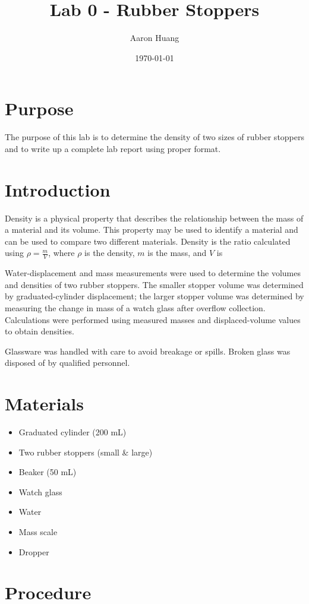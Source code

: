 \documentclass{article}
\begin{document}
\title{Lab 0 - Rubber Stoppers}
\author{Aaron Huang}
\date{\today}
\maketitle
\section{Purpose}
The purpose of this lab is to determine the density of two sizes of rubber stoppers and to write up a complete lab report using proper format.
\section{Introduction}

Density is a physical property that describes the relationship between the mass of a material and its volume. This property may be used to identify a material and can be used to compare two different materials. Density is the ratio calculated using  $\rho = \frac{m}{V}$, where $\rho$ is the density, $m$ is the mass, and $V$ is

Water-displacement and mass measurements were used to determine the volumes and densities of two rubber stoppers. The smaller stopper volume was determined by graduated-cylinder displacement; the larger stopper volume was determined by measuring the change in mass of a watch glass after overflow collection. Calculations were performed using measured masses and displaced-volume values to obtain densities.

Glassware was handled with care to avoid breakage or spills. Broken glass was disposed of by qualified personnel.


\section{Materials}
\begin{itemize}
    \item Graduated cylinder (200 mL)
    \item Two rubber stoppers (small \& large)
    \item Beaker (50 mL)
    \item Watch glass
    \item Water
    \item Mass scale
    \item Dropper
\end{itemize}
\section{Procedure}
\end{document}
